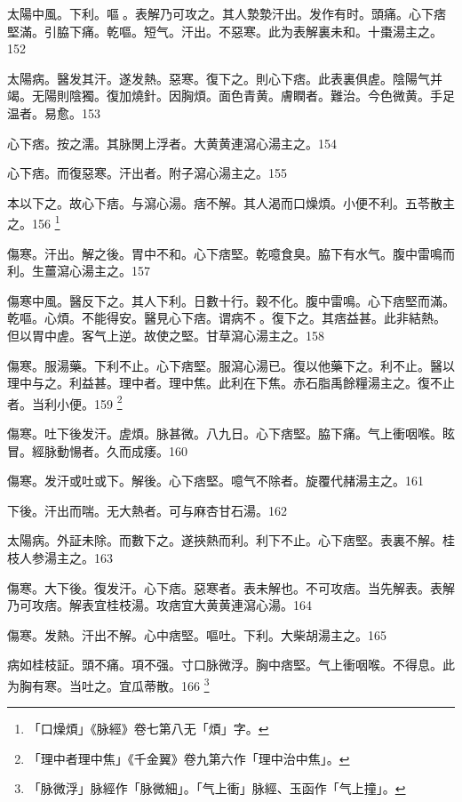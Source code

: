 太陽中風。下利。嘔{\sungtpii 𠱘}。表解乃可攻之。其人漐漐汗出。发作有时。頭痛。心下痞堅滿。引脇下痛。乾嘔。短气。汗出。不惡寒。此为表解裏未和。十棗湯主之。152

太陽病。醫发其汗。遂发熱。惡寒。復下之。則心下痞。此表裏俱虗。陰陽气并竭。无陽則陰獨。復加燒針。因胸煩。面色青黄。膚瞤者。難治。今色微黄。手足温者。易愈。153

心下痞。按之濡。其脉関上浮者。大黄{\khaaitp 黄連}瀉心湯主之。154

心下痞。而復惡寒。汗出者。附子瀉心湯主之。155

本以下之。故心下痞。与瀉心湯。痞不解。其人渴而口燥{\khaaitp 煩}。小便不利。五苓散主之。156
	\footnote{
		「口燥煩」《脉經》卷七第八无「煩」字。
	}

傷寒。汗出。解之後。胃中不和。心下痞堅。乾噫食臭。脇下有水气。腹中雷鳴而利。生薑瀉心湯主之。157

傷寒中風。醫反下之。其人下利。日數十行。穀不化。腹中雷鳴。心下痞堅而滿。乾嘔。心煩。不{\khaaitp 能}得安。醫見心下痞。谓病不{\sungtpii 𥁞}。復下之。其痞益甚。此非結熱。但以胃中虗。客气上逆。故使之堅。甘草瀉心湯主之。158

傷寒。服湯藥。下利不止。心下痞堅。服瀉心湯已。復以他藥下之。利不止。醫以理中与之。利益甚。理中者。理中焦。此利在下焦。赤石脂禹餘糧湯主之。復不止者。当利小便。159
	\footnote{
		「理中者理中焦」《千金翼》卷九第六作「理中治中焦」。
	}

傷寒。吐下{\khaaitp 後}发汗。虗煩。脉甚微。八九日。心下痞堅。脇下痛。气上衝咽喉。眩冒。經脉動愓者。久而成痿。160

傷寒。发汗{\khaaitp 或}吐{\khaaitp 或}下。解後。心下痞堅。噫气不除者。旋覆代赭湯主之。161

下後。汗出而喘。无大熱者。可与麻杏甘石湯。162

太陽病。外証未除。而數下之。遂挾熱而利。利下不止。心下痞堅。表裏不解。桂枝人参湯主之。163

傷寒。大下後。復发汗。心下痞。惡寒者。表未解也。不可攻痞。当先解表。表解乃可攻痞。解表宜桂枝湯。攻痞宜大黄黄連瀉心湯。164

傷寒。发熱。汗出不解。心中痞堅。嘔吐。下利。大柴胡湯主之。165

病如桂枝証。頭不痛。項不强。寸{\khaaitp 口}脉微浮。胸中痞堅。气上衝咽喉。不得息。此为胸有寒。当吐之。宜瓜蒂散。166
	\footnote{「脉微浮」脉經作「脉微細」。「气上衝」脉經、玉函作「气上撞」。}

